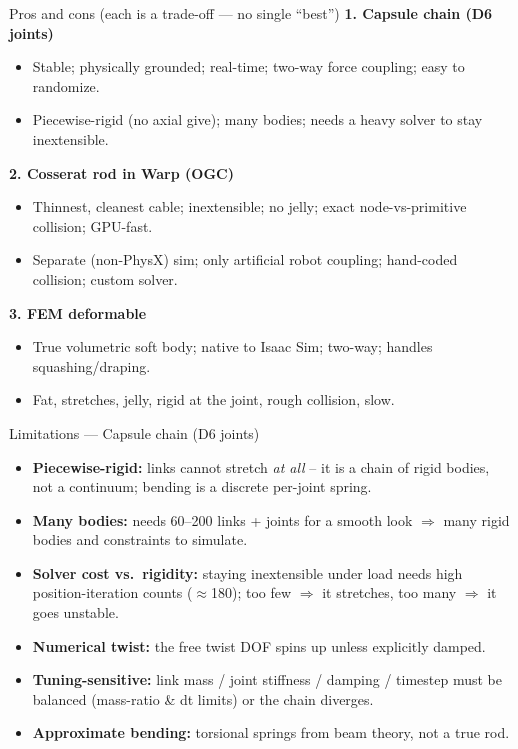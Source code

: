 \documentclass[aspectratio=169]{beamer}
\begin{document}
\begin{frame}{Pros and cons (each is a trade-off --- no single ``best'')}
  \footnotesize
  \textbf{1. Capsule chain (D6 joints)}
  \begin{itemize}\itemsep0pt
    \item[\textcolor{green!50!black}{+}] Stable; physically grounded; real-time; two-way force coupling; easy to randomize.
    \item[\textcolor{red!70!black}{--}] Piecewise-rigid (no axial give); many bodies; needs a heavy solver to stay inextensible.
  \end{itemize}
  \textbf{2. Cosserat rod in Warp (OGC)}
  \begin{itemize}\itemsep0pt
    \item[\textcolor{green!50!black}{+}] Thinnest, cleanest cable; inextensible; no jelly; exact node-vs-primitive collision; GPU-fast.
    \item[\textcolor{red!70!black}{--}] Separate (non-PhysX) sim; only artificial robot coupling; hand-coded collision; custom solver.
  \end{itemize}
  \textbf{3. FEM deformable}
  \begin{itemize}\itemsep0pt
    \item[\textcolor{green!50!black}{+}] True volumetric soft body; native to Isaac Sim; two-way; handles squashing/draping.
    \item[\textcolor{red!70!black}{--}] Fat, stretches, jelly, rigid at the joint, rough collision, slow.
  \end{itemize}
\end{frame}

\begin{frame}{Limitations --- Capsule chain (D6 joints)}
  \footnotesize
  \begin{itemize}\itemsep2pt
    \item \textbf{Piecewise-rigid:} links cannot stretch \emph{at all} -- it is a chain
          of rigid bodies, not a continuum; bending is a discrete per-joint spring.
    \item \textbf{Many bodies:} needs 60--200 links + joints for a smooth look
          $\Rightarrow$ many rigid bodies and constraints to simulate.
    \item \textbf{Solver cost vs.\ rigidity:} staying inextensible under load needs
          high position-iteration counts ($\approx$180); too few $\Rightarrow$ it
          stretches, too many $\Rightarrow$ it goes unstable.
    \item \textbf{Numerical twist:} the free twist DOF spins up unless explicitly damped.
    \item \textbf{Tuning-sensitive:} link mass / joint stiffness / damping / timestep
          must be balanced (mass-ratio \& dt limits) or the chain diverges.
    \item \textbf{Approximate bending:} torsional springs from beam theory, not a true rod.
  \end{itemize}
\end{frame}
\end{document}
